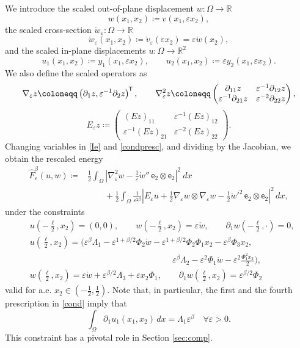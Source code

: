 \documentclass[a4, 11pt, reqno, final]{amsart}
\newcommand{\bbR}{\mathbb{R}}
\newcommand\e{\varepsilon}
\theoremstyle{plain}%
\newcommand*{\tran}{^{\mkern-1.5mu\mathsf{T}}}
\begin{document}
	We
	introduce the scaled out-of-plane displacement $w: \Omega\to\bbR$
	$$
	w(x_1, x_2) \coloneqq   v(x_1, \e x_2),
	$$
	the scaled cross-section $\mathring{w}_\e: \Omega\to\bbR$
	$$
	\mathring{w}_\e(x_1, x_2) \coloneqq   \mathring{v}_\e(\e x_2)=\e \mathring{w}(x_2),
	$$
	and
	the scaled in-plane displacements $u: \Omega\to\bbR^2$
	$$
	u_1(x_1, x_2) \coloneqq   y_1(x_1, \e x_2), \qquad u_2(x_1, x_2) \coloneqq   \e y_2(x_1, \e x_2).
	$$
	We also define the scaled operators as
	$$
	\nabla_\e z\coloneqq   \left(\partial_1 z, \e^{-1}\partial_2 z\right)\tran, \qquad  \nabla^2_\e z\coloneqq
	\begin{pmatrix}
		\partial_{11}z & \e^{-1}\partial_{12}z\\
		\e^{-1}\partial_{21}z & \e^{-2}\partial_{22}z
	\end{pmatrix},
	$$
	$$
	E_\e z\coloneqq
	\begin{pmatrix}
		(Ez)_{11} & \e^{-1}(Ez)_{12}\\
		\e^{-1}(Ez)_{21} & \e^{-2}(Ez)_{22}
	\end{pmatrix}.
	$$
	Changing variables in \eqref{Ie} and \eqref{condpresc}, and dividing by the Jacobian, we obtain the rescaled energy
	\begin{align}\label{Fe}
		\hat{F}_\e^\beta(u, w) \coloneqq & \frac{1}{2}\int_\Omega  \left| \nabla^2_\e w - \frac{1}{\e} \mathring{w}'' \, \mathsf{e}_2 \otimes \mathsf{e}_2 \right|^2 \ dx \nonumber\\ & \qquad + \frac{1}{2}\int_\Omega  \frac{1}{\e^{2\beta}} \left| E_\e u + \frac{1}{2} \nabla_\e w \otimes \nabla_\e w - \frac{1}{2} \mathring{w}'^2 \, \mathsf{e}_2 \otimes \mathsf{e}_2 \right|^2 \, dx,
	\end{align}
	under the constraints
	\begin{equation}\label{cond}
		\begin{aligned}
			&u(-\frac{\ell}{2}, x_2) = (0,0), \qquad w(-\frac{\ell}{2}, x_2) = \e\mathring{w}, \qquad \partial_1 w(-\frac{\ell}{2}, \cdot)=0, \\
			& 	u(\frac{\ell}{2}, x_2) =
			(\e^\beta\Lambda_1 -\e^{1+\beta/2}\Phi_2\mathring{w} -\e^{1+\beta/2} \Phi_2\Phi_1 x_2 - \e^\beta \Phi_3 x_2, \\ & \hspace{7cm} \e^\beta \Lambda_2 - \e^2 \Phi_1\mathring{w} -\e^2 \frac{\Phi_1^2 x_2}{2}),\\
			&	 w(\frac{\ell}{2}, x_2) = \e\mathring{w} + \e^{\beta/2} \Lambda_3 + \e x_2 \Phi_1, \qquad   \partial_1 w(\frac{\ell}{2}, x_2)=\e^{\beta/2} \Phi_2
		\end{aligned}
	\end{equation}
	valid for a.e. $x_2 \in (-\frac12, \frac12)$.
	Note that, in particular, the first and the fourth prescription in \eqref{cond} imply that
	\begin{equation}\label{condvar}
		\int_\Omega \partial_1 u_1(x_1, x_2) \, dx  = \Lambda_1 \e^\beta \quad \forall \e > 0.
	\end{equation}
	This constraint has a pivotal role in Section \ref{sec:comp}.
\end{document}
